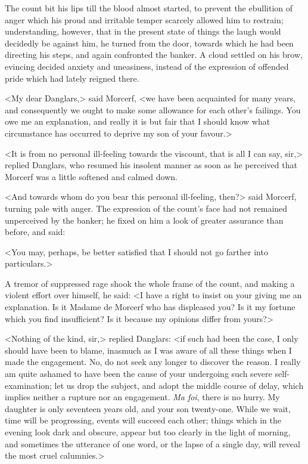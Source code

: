  The count bit his lips till the blood almost started, to prevent the ebullition of anger which his proud and irritable temper scarcely allowed him to restrain; understanding, however, that in the present state of things the laugh would decidedly be against him, he turned from the door, towards which he had been directing his steps, and again confronted the banker. A cloud settled on his brow, evincing decided anxiety and uneasiness, instead of the expression of offended pride which had lately reigned there. 

 <My dear Danglars,> said Morcerf, <we have been acquainted for many years, and consequently we ought to make some allowance for each other's failings. You owe me an explanation, and really it is but fair that I should know what circumstance has occurred to deprive my son of your favour.> 

 <It is from no personal ill-feeling towards the viscount, that is all I can say, sir,> replied Danglars, who resumed his insolent manner as soon as he perceived that Morcerf was a little softened and calmed down. 

 <And towards whom do you bear this personal ill-feeling, then?> said Morcerf, turning pale with anger. The expression of the count's face had not remained unperceived by the banker; he fixed on him a look of greater assurance than before, and said: 

 <You may, perhaps, be better satisfied that I should not go farther into particulars.> 

 A tremor of suppressed rage shook the whole frame of the count, and making a violent effort over himself, he said: <I have a right to insist on your giving me an explanation. Is it Madame de Morcerf who has displeased you? Is it my fortune which you find insufficient? Is it because my opinions differ from yours?> 

 <Nothing of the kind, sir,> replied Danglars: <if such had been the case, I only should have been to blame, inasmuch as I was aware of all these things when I made the engagement. No, do not seek any longer to discover the reason. I really am quite ashamed to have been the cause of your undergoing such severe self-examination; let us drop the subject, and adopt the middle course of delay, which implies neither a rupture nor an engagement. \textit{Ma foi}, there is no hurry. My daughter is only seventeen years old, and your son twenty-one. While we wait, time will be progressing, events will succeed each other; things which in the evening look dark and obscure, appear but too clearly in the light of morning, and sometimes the utterance of one word, or the lapse of a single day, will reveal the most cruel calumnies.> 

